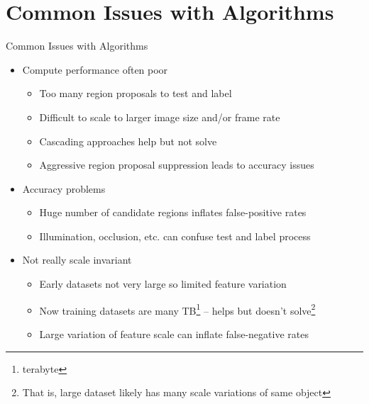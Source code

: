 \documentclass[handout]{beamer}
\begin{document}
\section{Common Issues with Algorithms}
\begin{frame}{Common Issues with Algorithms}
\begin{itemize}
\itemsep1em
	\item<1->Compute performance often poor 
		\begin{itemize}[square]
			\item<1->Too many region proposals to test and label
			\item<2->Difficult to scale to larger image size and/or frame rate
			\item<3->Cascading approaches help but not solve
			\item<4->Aggressive region proposal suppression leads to accuracy issues
		\end{itemize}
	\item<2->Accuracy problems
		\begin{itemize}[square]
			\item<1->Huge number of candidate regions inflates false-positive rates
			\item<2->Illumination, occlusion, etc. can confuse test and label process
		\end{itemize}
	\item<3->Not really scale invariant
		\begin{itemize}[square]
			\item<1->Early datasets not very large so limited feature variation
			\item<2->Now training datasets are many TB\footnote{terabyte} -- helps but doesn't solve\footnote{That is, large dataset likely has many scale variations of same object}
			\item<3->Large variation of feature scale can inflate false-negative rates
		\end{itemize}
\end{itemize}
\end{frame}
\end{document}
